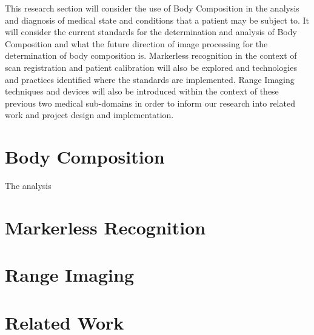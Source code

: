 This research section will consider the use of Body Composition in the analysis and diagnosis of medical state and conditions that a patient may be subject to. It will consider the current standards for the determination and analysis of Body Composition and what the future direction of image processing for the determination of body composition is. Markerless recognition in the context of scan registration and patient calibration will also be explored and technologies and practices identified where the standards are implemented. Range Imaging techniques and devices will also be introduced within the context of these previous two medical sub-domains in order to inform our research into related work and project design and implementation.

\section{Body Composition}

The analysis

\section{Markerless Recognition}

\section{Range Imaging}

\section{Related Work}

